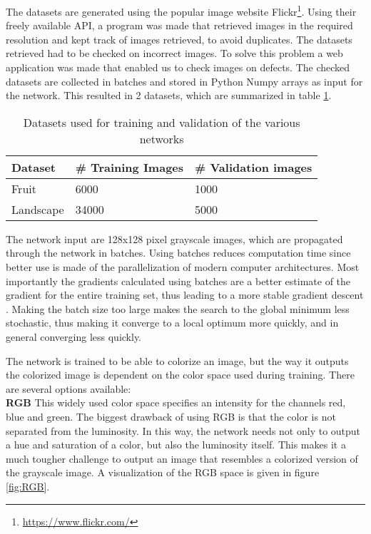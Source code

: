 The datasets are generated using the popular image website Flickr\footnote{\url{https://www.flickr.com/}}.
Using their freely available API, a program was made that retrieved images in the required resolution and kept track of images retrieved, to avoid duplicates. The datasets retrieved had to be checked on incorrect images. To solve this problem a web application was made that enabled us to check images on defects. The checked datasets are collected in batches and stored in Python Numpy arrays as input for the network.
This resulted in 2 datasets, which are summarized in table \ref{tab:dataset}.

\begin{table}[h!]
	\centering
	\caption{Datasets used for training and validation of the various networks}
	\label{tab:dataset}
	\begin{tabular}{|l|l|l|}
		\hline
		\textbf{Dataset}   & \textbf{\# Training Images} & \textbf{\# Validation images} \\ \hline \hline
		Fruit     & 6000            & 1000              \\ \hline
		Landscape & 34000           & 5000              \\ \hline
	\end{tabular}
\end{table}

The network input are 128x128 pixel grayscale images, which are propagated through the network in batches. Using batches reduces computation time since better use is made of the parallelization of modern computer architectures. Most importantly the gradients calculated using batches are a better estimate of the gradient for the entire training set, thus leading to a more stable gradient descent \cite{ioffe2015batch}. Making the batch size too large makes the search to the global minimum less stochastic, thus making it converge to a local optimum more quickly, and in general converging less quickly. 

The network is trained to be able to colorize an image, but the way it outputs the colorized image is dependent on the color space used during training. There are several options available:\\

\textbf{RGB} This widely used color space specifies an intensity for the channels red, blue and green. The biggest drawback of using RGB is that the color is not separated from the luminosity. In this way, the network needs not only to output a hue and saturation of a color, but also the luminosity itself. This makes it a much tougher challenge to output an image that resembles a colorized version of the grayscale image. A visualization of the RGB space is given in figure \ref{fig:RGB}.

